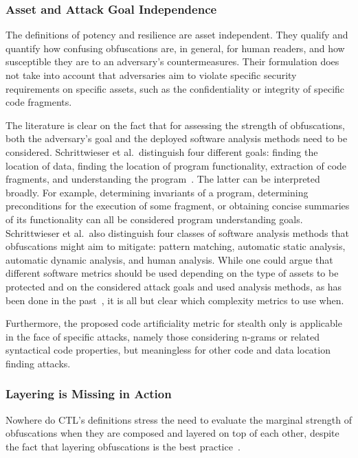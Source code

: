 \subsubsection{Asset and Attack Goal Independence}
The definitions of potency and resilience are asset independent. They qualify and quantify how confusing obfuscations are, in general, for human readers, and how susceptible they are to an adversary's countermeasures. Their formulation does not take into account that adversaries aim to violate specific security requirements on specific assets, such as the confidentiality or integrity of specific code fragments. 

The literature is clear on the fact that for assessing the strength of obfuscations, both the adversary's goal and the deployed software analysis methods need to be considered. Schrittwieser et al.\ distinguish four different goals: finding the location of data, finding the location of program functionality, extraction of code fragments, and understanding the program~\cite{survey2016}. The latter can be interpreted broadly. For example, determining invariants of a program, determining preconditions for the execution of some fragment, or obtaining concise summaries of its functionality can all be considered program understanding goals. Schrittwieser et al.\ also distinguish four classes of software analysis methods that obfuscations might aim to mitigate: pattern matching, automatic static analysis, automatic dynamic analysis, and human analysis. While one could argue that different software metrics should be used depending on the type of assets to be protected and on the considered attack goals and used analysis methods, as has been done in the past~\cite{anckaert}, it is all but clear which complexity metrics to use when.

Furthermore, the proposed code artificiality metric for stealth only is applicable in the face of specific attacks, namely those considering n-grams or related syntactical code properties, but meaningless for other code and data location finding attacks. 

\subsubsection{Layering is Missing in Action}
\label{sec:layering_missing}
Nowhere do CTL's definitions stress the need to evaluate the marginal strength of obfuscations when they are composed and layered on top of each other, despite the fact that layering obfuscations is the best practice~\cite{layering,collbergbook,recipes}.

